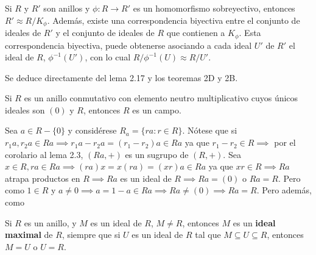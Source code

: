 \begin{teorema}
    Si $R$ y $R'$ son anillos y $\phi:R\to R'$ es un homomorfismo sobreyectivo, entonces $R'\approx R/K_\phi$. Además, existe una correspondencia biyectiva entre el conjunto de ideales de $R'$ y el conjunto de ideales de $R$ que contienen a $K_\phi$. Esta correspondencia biyectiva, puede obtenerse asociando  a cada ideal $U'$ de $R'$ el ideal de $R$, $\phi^{-1}(U')$, con lo cual $R/\phi^{-1}(U)\approx R/U'$.
    \begin{dem}
        Se deduce directamente del lema 2.17 y los teoremas 2D y 2B. 
    \end{dem}
\end{teorema}


\begin{lema}[3.7]
    Si $R$ es un anillo conmutativo con elemento neutro multiplicativo cuyos únicos ideales son $(0)$ y $R$, entonces $R$ es un campo. 
    \begin{dem}
        Sea $a\in R-\{0\}$ y considérese $R_a=\{ra:r\in R\}$. Nótese que si $r_1a,r_2a\in Ra\implies r_1a-r_2a=(r_1-r_2)a\in Ra$ ya que $r_1-r_2\in R\implies$ por el corolario al lema 2.3, $(Ra,+)$ es un sugrupo de $(R,+)$. Sea $x\in R, ra\in Ra\implies (ra)x =x(ra)=(xr)a\in Ra$ ya que $xr\in R\implies Ra$ atrapa productos en $R\implies Ra$ es un ideal de $R\implies Ra=(0)$ o $Ra=R$. Pero como $1\in R$ y $a\neq 0\implies a=1-a\in Ra\implies Ra\neq (0)\implies Ra=R$. Pero además, como 
    \end{dem}
\end{lema}

\begin{definicion}
    Si $R$ es un anillo, y $M$ es un ideal de $R$, $M\neq R$, entonces $M$ es un \textbf{ideal maximal} de $R$, siempre que si $U$ es un ideal de $R$ tal que $M\subseteq U\subseteq R$, entonces $M=U$ o $U=R$.  
\end{definicion}